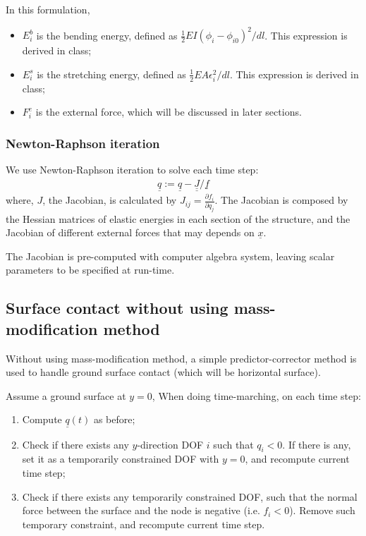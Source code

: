 \documentclass[letterpaper,9pt,twocolumn]{extarticle}
\begin{document}
			In this formulation,
			\begin{itemize}
				\item $E_i^b$ is the bending energy, defined as $\frac12 EI(\phi_i - \phi_{i0})^2 / dl$. This expression is derived in class;
				\item $E_i^s$ is the stretching energy, defined as $\frac12 EA \epsilon_i^2 / dl$. This expression is derived in class;
				\item $F_i^e$ is the external force, which will be discussed in later sections.
			\end{itemize}
		\subsubsection{Newton-Raphson iteration}
			We use Newton-Raphson iteration to solve each time step:
			\begin{align}
				\underline q := \underline q - \underline{\underline J} / \underline{f}
			\end{align}
			where, $J$, the Jacobian, is calculated by $J_{ij} = \frac{\partial f_i}{\partial q_j}$. The Jacobian is composed by the Hessian matrices of elastic energies in each section of the structure, and the Jacobian of different external forces that may depends on $\underline x$.
			
			The Jacobian is pre-computed with computer algebra system, leaving scalar parameters to be specified at run-time.
	\subsection{Surface contact without using mass-modification method}
		Without using mass-modification method, a simple predictor-corrector method is used to handle ground surface contact (which will be horizontal surface).
		
		Assume a ground surface at $y = 0$, When doing time-marching, on each time step:
		\begin{enumerate}
			\item Compute $\underline q(t)$ as before;
			\item Check if there exists any $y$-direction DOF $i$ such that $q_i < 0$. If there is any, set it as a temporarily constrained DOF with $y = 0$, and recompute current time step;
			\item Check if there exists any temporarily constrained DOF, such that the normal force between the surface and the node is negative (i.e. $f_i < 0$). Remove such temporary constraint, and recompute current time step.
		\end{enumerate}
\end{document}
